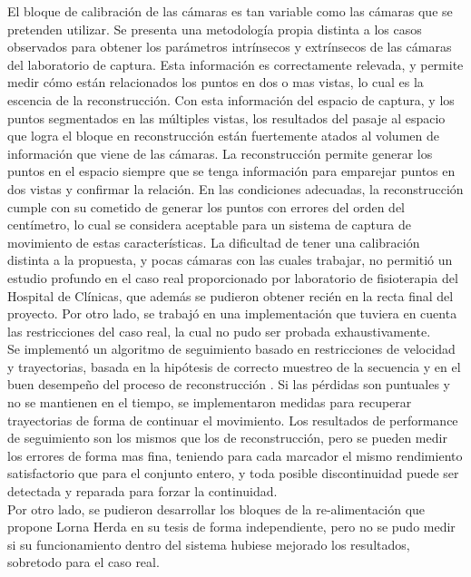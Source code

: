 El bloque de calibración de las cámaras es tan variable como las cámaras que se pretenden utilizar. Se presenta una metodología propia distinta a los casos observados para obtener los parámetros intrínsecos y extrínsecos de las cámaras del laboratorio de captura. Esta información es correctamente relevada, y permite medir cómo están relacionados los puntos en dos o mas vistas, lo cual es la escencia de la reconstrucción. Con esta información del espacio de captura, y los puntos segmentados en las múltiples vistas, los resultados del pasaje al espacio que logra el bloque en reconstrucción están fuertemente atados al volumen de información que viene de las cámaras. La reconstrucción permite generar los puntos en el espacio siempre que se tenga información para emparejar puntos en dos vistas y confirmar la relación. En las condiciones adecuadas, la reconstrucción cumple con su cometido de generar los puntos con errores del orden del centímetro, lo cual se considera aceptable para un sistema de captura de movimiento de estas características. La dificultad de tener una calibración distinta a la propuesta, y pocas cámaras con las cuales trabajar, no permitió un estudio profundo en el caso real proporcionado por laboratorio de fisioterapia del Hospital de Clínicas, que además se pudieron obtener recién en la recta final del proyecto. Por otro lado, se trabajó en una implementación que tuviera en cuenta las restricciones del caso real, la cual no pudo ser probada exhaustivamente.
\\ 

Se implementó un algoritmo de seguimiento basado en restricciones de velocidad y trayectorias, basada en la hipótesis de correcto muestreo de la secuencia y en el buen desempeño del proceso de reconstrucción . Si las pérdidas son puntuales y no se mantienen en el tiempo, se implementaron medidas para recuperar trayectorias de forma de continuar el movimiento. Los resultados de performance de seguimiento son los mismos que los de reconstrucción, pero se pueden medir los errores de forma mas fina, teniendo para cada marcador el mismo rendimiento satisfactorio que para el conjunto entero, y toda posible discontinuidad puede ser detectada y reparada para forzar la continuidad. 
\\ 

Por otro lado, se pudieron desarrollar los bloques de la re-alimentación que propone Lorna Herda en su tesis de forma independiente, pero no se pudo medir si su funcionamiento dentro del sistema hubiese mejorado los resultados, sobretodo para el caso real.
\\

